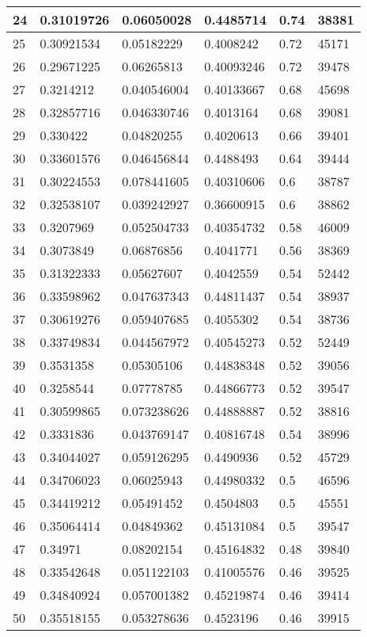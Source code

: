 \begin{longtable}{|l|l|l|l|l|l|}
24 & 0.31019726 & 0.06050028 & 0.4485714 & 0.74 & 38381 \\ \hline 
25 & 0.30921534 & 0.05182229 & 0.4008242 & 0.72 & 45171 \\ \hline 
26 & 0.29671225 & 0.06265813 & 0.40093246 & 0.72 & 39478 \\ \hline 
27 & 0.3214212 & 0.040546004 & 0.40133667 & 0.68 & 45698 \\ \hline 
28 & 0.32857716 & 0.046330746 & 0.4013164 & 0.68 & 39081 \\ \hline 
29 & 0.330422 & 0.04820255 & 0.4020613 & 0.66 & 39401 \\ \hline 
30 & 0.33601576 & 0.046456844 & 0.4488493 & 0.64 & 39444 \\ \hline 
31 & 0.30224553 & 0.078441605 & 0.40310606 & 0.6 & 38787 \\ \hline 
32 & 0.32538107 & 0.039242927 & 0.36600915 & 0.6 & 38862 \\ \hline 
33 & 0.3207969 & 0.052504733 & 0.40354732 & 0.58 & 46009 \\ \hline 
34 & 0.3073849 & 0.06876856 & 0.4041771 & 0.56 & 38369 \\ \hline 
35 & 0.31322333 & 0.05627607 & 0.4042559 & 0.54 & 52442 \\ \hline 
36 & 0.33598962 & 0.047637343 & 0.44811437 & 0.54 & 38937 \\ \hline 
37 & 0.30619276 & 0.059407685 & 0.4055302 & 0.54 & 38736 \\ \hline 
38 & 0.33749834 & 0.044567972 & 0.40545273 & 0.52 & 52449 \\ \hline 
39 & 0.3531358 & 0.05305106 & 0.44838348 & 0.52 & 39056 \\ \hline 
40 & 0.3258544 & 0.07778785 & 0.44866773 & 0.52 & 39547 \\ \hline 
41 & 0.30599865 & 0.073238626 & 0.44888887 & 0.52 & 38816 \\ \hline 
42 & 0.3331836 & 0.043769147 & 0.40816748 & 0.54 & 38996 \\ \hline 
43 & 0.34044027 & 0.059126295 & 0.4490936 & 0.52 & 45729 \\ \hline 
44 & 0.34706023 & 0.06025943 & 0.44980332 & 0.5 & 46596 \\ \hline 
45 & 0.34419212 & 0.05491452 & 0.4504803 & 0.5 & 45551 \\ \hline 
46 & 0.35064414 & 0.04849362 & 0.45131084 & 0.5 & 39547 \\ \hline 
47 & 0.34971 & 0.08202154 & 0.45164832 & 0.48 & 39840 \\ \hline 
48 & 0.33542648 & 0.051122103 & 0.41005576 & 0.46 & 39525 \\ \hline 
49 & 0.34840924 & 0.057001382 & 0.45219874 & 0.46 & 39414 \\ \hline 
50 & 0.35518155 & 0.053278636 & 0.4523196 & 0.46 & 39915 \\ \hline 
\end{longtable}